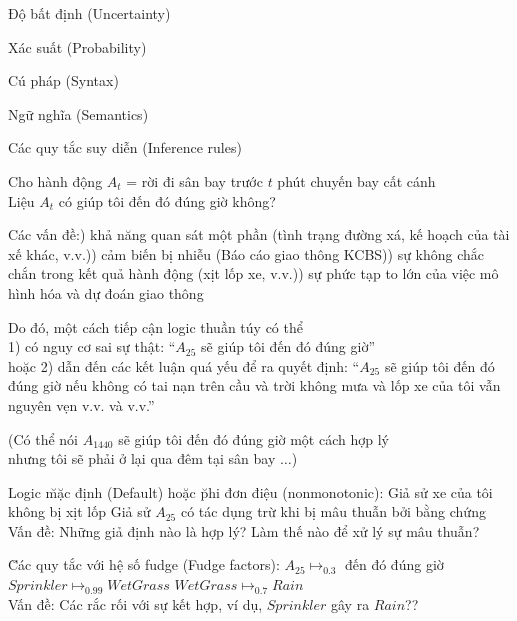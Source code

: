 \documentclass[fleqn]{article}
\begin{document}
\begin{huge}


\blob Độ bất định (Uncertainty)

\blob Xác suất (Probability)

\blob Cú pháp (Syntax)

\blob Ngữ nghĩa (Semantics)

\blob Các quy tắc suy diễn (Inference rules)



Cho hành động $A_t$ = rời đi sân bay trước $t$ phút chuyến bay cất cánh\\
Liệu $A_t$ có giúp tôi đến đó đúng giờ không?

Các vấn đề:) khả năng quan sát một phần (tình trạng đường xá, kế hoạch của tài xế khác, v.v.)) cảm biến bị nhiễu (Báo cáo giao thông KCBS)) sự không chắc chắn trong kết quả hành động (xịt lốp xe, v.v.)) sự phức tạp to lớn của việc mô hình hóa và dự đoán giao thông

Do đó, một cách tiếp cận logic thuần túy có thể\\
\phantom{hoặc }1) có nguy cơ sai sự thật: ``$A_{25}$ sẽ giúp tôi đến đó đúng giờ''\\
hoặc 2) dẫn đến các kết luận quá yếu để ra quyết định:\nl
``$A_{25}$ sẽ giúp tôi đến đó đúng giờ nếu không có tai nạn trên cầu\nl
và trời không mưa và lốp xe của tôi vẫn nguyên vẹn v.v. và v.v.''

(Có thể nói $A_{1440}$ sẽ giúp tôi đến đó đúng giờ một cách hợp lý\\
nhưng tôi sẽ phải ở lại qua đêm tại sân bay $\ldots$)




Logic \u{mặc định (Default)} hoặc \u{phi đơn điệu (nonmonotonic)}:\al
  Giả sử xe của tôi không bị xịt lốp\al
  Giả sử $A_{25}$ có tác dụng trừ khi bị mâu thuẫn bởi bằng chứng\\
Vấn đề: Những giả định nào là hợp lý? Làm thế nào để xử lý sự mâu thuẫn?

\u{Các quy tắc với hệ số fudge (Fudge factors)}:\al
$A_{25} \mapsto_{0.3}$ đến đó đúng giờ\al
$Sprinkler \mapsto_{0.99} WetGrass$\al
$WetGrass \mapsto_{0.7} Rain$\\
Vấn đề: Các rắc rối với sự kết hợp, ví dụ, $Sprinkler$ gây ra $Rain$??


\end{huge}
\end{document}

